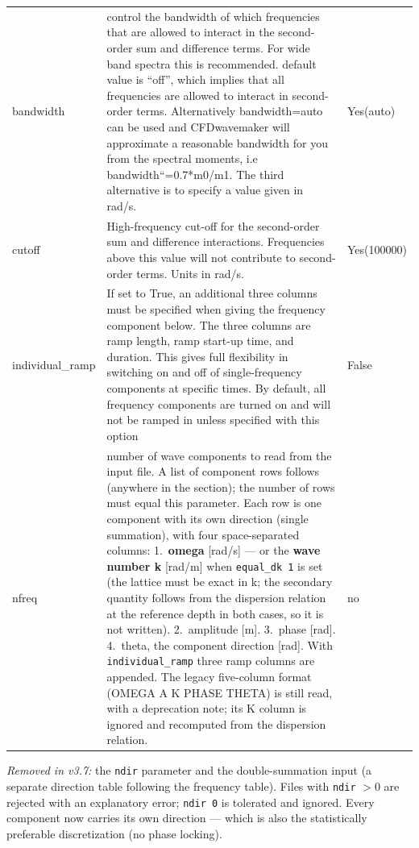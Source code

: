 {\begin{xltabular}{\textwidth}{@{}lXl@{}}
bandwidth&control the bandwidth of which frequencies that are allowed to interact in the second-order sum and difference terms. For wide band spectra this is recommended. default value is “off”, which implies that all frequencies are allowed to interact in second-order terms. Alternatively bandwidth=auto can be used and CFDwavemaker will approximate a reasonable bandwidth for you from the spectral moments, i.e bandwidth``=0.7*m0/m1. The third alternative is to specify a value given in rad/s.&Yes(auto)\\

cutoff&High-frequency cut-off for the second-order sum and difference interactions. Frequencies above this value will not contribute to second-order terms. Units in rad/s.&Yes(100000)\\


individual\_ramp & If set to True, an additional three columns must be specified when giving the frequency component below. The three columns are ramp length, ramp start-up time, and duration. This gives full flexibility in switching on and off of single-frequency components at specific times. By default, all frequency components are turned on and will not be ramped in unless specified with this option & False \\

nfreq&number of wave components to read from the input file. A list of component rows follows (anywhere in the section); the number of rows must equal this parameter. Each row is one component with its own direction (single summation), with four space-separated columns: 1.~\textbf{omega} [rad/s] --- or the \textbf{wave number k} [rad/m] when \texttt{equal\_dk 1} is set (the lattice must be exact in k; the secondary quantity follows from the dispersion relation at the reference depth in both cases, so it is not written). 2.~amplitude [m]. 3.~phase [rad]. 4.~theta, the component direction [rad]. With \texttt{individual\_ramp} three ramp columns are appended. The legacy five-column format (OMEGA A K PHASE THETA) is still read, with a deprecation note; its K column is ignored and recomputed from the dispersion relation.&no\\
\end{xltabular}}
\emph{Removed in v3.7:} the \texttt{ndir} parameter and the double-summation input (a separate direction table following the frequency table). Files with \texttt{ndir} $> 0$ are rejected with an explanatory error; \texttt{ndir 0} is tolerated and ignored. Every component now carries its own direction --- which is also the statistically preferable discretization (no phase locking).


